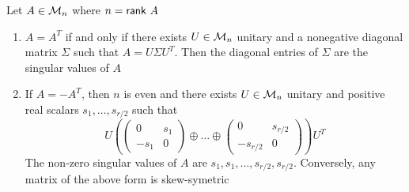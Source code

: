 \documentclass[aspectratio=169]{beamer}
\begin{document}
\begin{frame}
\begin{theorem}
	Let $A\in \mathcal{M}_n$ where $n= \mathsf{rank}\ A$
	\begin{enumerate}
		\item $A= A^T$ if and only if there exists $U \in \mathcal{M}_n$ unitary and a nonegative diagonal matrix $\Sigma$ such that $A= U \Sigma U^T$. Then the diagonal entries of $\Sigma$ are the singular values of $A$
		\item If $A=-A^T$, then $n$ is even and there exists $U \in \mathcal{M}_n$ unitary and positive real scalars $s_1, \dots , s_{r/2}$ such that 
		\[
			U \left( \begin{pmatrix}
			0& s_1\\
			-s_1& 0
			\end{pmatrix} \oplus \dots \oplus 
			\begin{pmatrix}
			0& s_{r/2}\\
			-s_{r/2}& 0
			\end{pmatrix}\right)U^T
		\]
		The non-zero singular values of $A$ are $s_1,s_1,  \dots, s_{r/2}, s_{r/2}$.
		Conversely, any matrix of the above form is skew-symetric
	\end{enumerate}
\end{theorem}
\end{frame}
\end{document}
